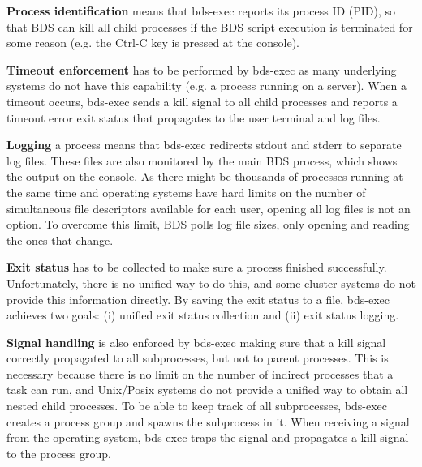 
\textbf{Process identification} means that bds-exec reports its process ID (PID), so that BDS can kill all child processes if the BDS script execution is terminated for some reason (e.g. the Ctrl-C key is pressed at the console).

\textbf{Timeout enforcement} has to be performed by bds-exec as many underlying systems do not have this capability (e.g. a process running on a server). When a timeout occurs, bds-exec sends a kill signal to all child processes and reports a timeout error exit status that propagates to the user terminal and log files.

\textbf{Logging} a process means that bds-exec redirects stdout and stderr to separate log files. These files are also monitored by the main BDS process, which shows the output on the console. As there might be thousands of processes running at the same time and operating systems have hard limits on the number of simultaneous file descriptors available for each user, opening all log files is not an option. To overcome this limit, BDS polls log file sizes, only opening and reading the ones that change.

\textbf{Exit status} has to be collected to make sure a process finished successfully. Unfortunately, there is no unified way to do this, and some cluster systems do not provide this information directly. By saving the exit status to a file, bds-exec achieves two goals: (i) unified exit status collection and (ii) exit status logging.

\textbf{Signal handling} is also enforced by bds-exec making sure that a kill signal correctly propagated to all subprocesses, but not to parent processes. This is necessary because there is no limit on the number of indirect processes that a task can run, and Unix/Posix systems do not provide a unified way to obtain all nested child processes. To be able to keep track of all subprocesses, bds-exec creates a process group and spawns the subprocess in it. When receiving a signal from the operating system, bds-exec traps the signal and propagates a kill signal to the process group.


